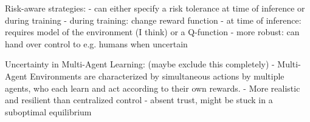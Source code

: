 Risk-aware strategies:
    - can either specify a risk tolerance at time of inference or during training
    - during training: change reward function
    - at time of inference: requires model of the environment (I think) or a Q-function
    - more robust: can hand over control to e.g. humans when uncertain
    
Uncertainty in Multi-Agent Learning: (maybe exclude this completely)
    - Multi-Agent Environments are characterized by simultaneous actions by multiple agents, who each learn and act according to their own rewards.
    - More realistic and resilient than centralized control
    - absent trust, might be stuck in a suboptimal equilibrium



  